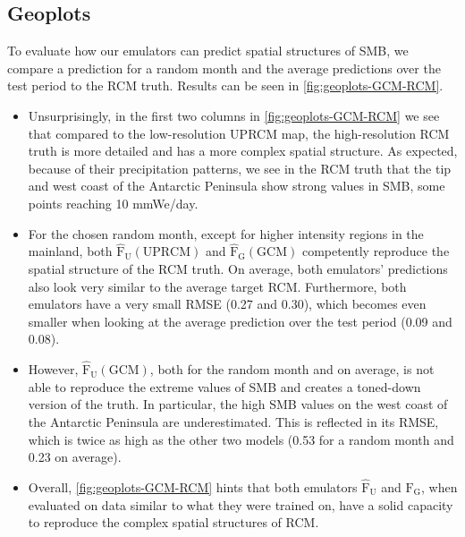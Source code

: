 \documentclass[a4paper,11pt,oneside]{report}
\begin{document}
\subsection{Geoplots}
To evaluate how our emulators can predict spatial structures of SMB, we compare a prediction for a random month and the average predictions over the test period to the RCM truth. Results can be seen in \autoref{fig:geoplots-GCM-RCM}. 
\begin{itemize}
    \item Unsurprisingly, in the first two columns in \autoref{fig:geoplots-GCM-RCM} we see that compared to the low-resolution UPRCM map, the high-resolution RCM truth is more detailed and has a more complex spatial structure. As expected, because of their precipitation patterns, we see in the RCM truth that the tip and west coast of the Antarctic Peninsula show strong values in SMB, some points reaching 10 \si{mmWe/day}. 
    \item For the chosen random month, except for higher intensity regions in the mainland, both $\mathrm{\hat{F}_{U}(UPRCM)}$ and $\mathrm{\hat{F}_{G}(GCM)}$ competently reproduce the spatial structure of the RCM truth. On average, both emulators' predictions also look very similar to the average target RCM. Furthermore, both emulators have a very small RMSE (0.27 and 0.30), which becomes even smaller when looking at the average prediction over the test period (0.09 and 0.08). 
    \item However, $\mathrm{\hat{F}_{U}(GCM)}$, both for the random month and on average, is not able to reproduce the extreme values of SMB and creates a toned-down version of the truth. In particular, the high SMB values on the west coast of the Antarctic Peninsula are underestimated. This is reflected in its RMSE, which is twice as high as the other two models (0.53 for a random month and 0.23 on average). 
    \item Overall, \autoref{fig:geoplots-GCM-RCM} hints that both emulators $\mathrm{\hat{F}_{U}}$ and $\mathrm{\hat{F}_{G}}$, when evaluated on data similar to what they were trained on, have a solid capacity to reproduce the complex spatial structures of RCM. 
\end{itemize}
\end{document}
